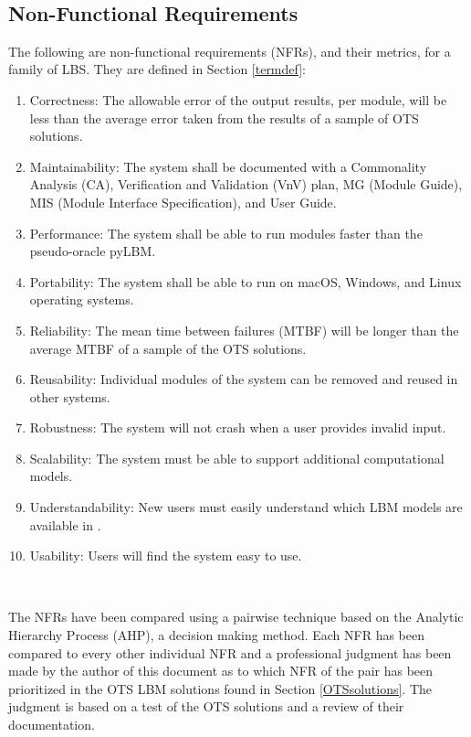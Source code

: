 \documentclass[12pt]{article}
\begin{document}
~\newpage

\subsection{Non-Functional Requirements}

The following are non-functional requirements (NFRs), and their metrics, for a family of LBS. They are defined in Section \ref{termdef}:

\begin{enumerate}
\item Correctness: The allowable error of the output results, per module, will be less than the average error taken from the results of a sample of OTS solutions.
\item Maintainability: The system shall be documented with a Commonality Analysis (CA), Verification and Validation (VnV) plan, MG (Module Guide), MIS (Module Interface Specification), and User Guide.
\item Performance: The system shall be able to run modules faster than the pseudo-oracle pyLBM.
\item Portability: The system shall be able to run on macOS, Windows, and Linux operating systems.
\item Reliability: The mean time between failures (MTBF) will be longer than the average MTBF of a sample of the OTS solutions.
\item Reusability: Individual modules of the system can be removed and reused in other systems.
\item Robustness: The system will not crash when a user provides invalid input.
\item Scalability: The system must be able to support additional computational models.
\item Understandability: New users must easily understand which LBM models are available in {\progname}.
\item Usability: Users will find the system easy to use.
\end{enumerate}

~\newpage

The NFRs have been compared using a pairwise technique based on the Analytic Hierarchy Process (AHP), a decision making method. Each NFR has been compared to every other individual NFR and a professional judgment has been made by the author of this document as to which NFR of the pair has been prioritized in the OTS LBM solutions found in Section \ref{OTSsolutions}. The judgment is based on a test of the OTS solutions and a review of their documentation.
\end{document}
